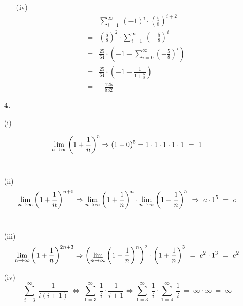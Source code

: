 \documentclass [a4paper,12pt]{article}
\begin{document}
\begin{enumerate}
\begin{enumerate}
        		\item[(iv)]
                    \begin{align*}
                        && \sum_{i=1}^\infty~(-1)^i  \cdot  \left( \frac{5}{8} \right)^{i+2} \\
                        &=&\left(\frac{5}{8}\right)^2 \cdot \sum_{i=1}^\infty~\left( -\frac{5}{8} \right)^{i} \\
                        &=&\frac{25}{64} \cdot \left( -1 + \sum_{i=0}^\infty \left( -\frac{5}{8} \right)^{i} \right) \\
                        &=&\frac{25}{64} \cdot \left( -1 + \frac{1}{1+\frac{5}{8}} \right) \\
                        &=&-\frac{125}{832}
                    \end{align*}
            \end{enumerate}
        \item[\textbf{4.}]
        		\item[(i)]
        			
        			$$\limp \left(1+\frac{1}{n} \right)^5 \Rightarrow (1+0)^5 = 1 \cdot 1 \cdot 1 \cdot 1 \cdot 1 \ = \ 1 $$  \\
        		\item[(ii)]
        			$$\limp \left( 1 + \frac{1}{n} \right)^{n+5} \Rightarrow \limp \left(1+\frac{1}{n} \right)^n \cdot \limp \left(1+\frac{1}{n} \right)^5 \ \Rightarrow \  e \cdot 1^5 \ = \ e  	$$ \\
        		\item[(iii)] 
        		$$ \limp \left( 1 + \frac{1}{n} \right)^{2n+3} \Rightarrow \left(\limp \left( 1 + \frac{1}{n} \right)^n \right)^2 \cdot \left(1+ \frac{1}{n} \right)^3 \ = \ e^2 \cdot 1^3 \ = \ e^2 $$
        		\item[(iv)]    
        		$$ \sum_{i=3}^\infty~\frac{1}{i(i+1)} \ \Leftrightarrow \ \sum_{1=3}^\infty~\frac{1}{i}\cdot\frac{1}{i+1} \Leftrightarrow \sum_{1=3}^\infty~\frac{1}{i} \cdot \sum_{1=4}^\infty~\frac{1}{i} \ = \ \infty \cdot \infty \ = \ \infty $$ 			
            
    \end{enumerate}
\end{document}
